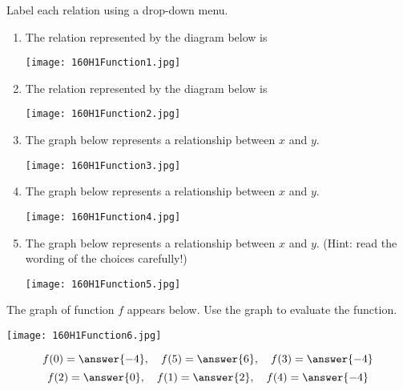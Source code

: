 \documentclass{ximera}
\begin{document}
\begin{problem}\label{prob:160hom1prob3}
Label each relation using a drop-down menu.
\begin{enumerate}
    \item The relation represented by the diagram below is 
    \begin{image}
   \texttt{[image: 160H1Function1.jpg]}
 \end{image}
 \item The relation represented by the diagram below is 
    \begin{image}
   \texttt{[image: 160H1Function2.jpg]}
 \end{image}
 \item The graph below represents a relationship between $x$ and $y$. 
    \begin{image}
   \texttt{[image: 160H1Function3.jpg]}
 \end{image}
 \item The graph below represents a relationship between $x$ and $y$. 
    \begin{image}
   \texttt{[image: 160H1Function4.jpg]}
 \end{image}
  \item The graph below represents a relationship between $x$ and $y$. 
  (Hint: read the wording of the choices carefully!)
    \begin{image}
   \texttt{[image: 160H1Function5.jpg]}
 \end{image}
\end{enumerate}
\end{problem}

\begin{problem}\label{prob:160hom1prob4}
The graph of function $f$ appears below.  Use the graph to evaluate the function.
\begin{image}
   \texttt{[image: 160H1Function6.jpg]}
 \end{image}
 $$f(0)=\answer{-4},\quad f(5)=\answer{6},\quad f(3)=\answer{-4}$$ $$f(2)=\answer{0},\quad f(1)=\answer{2},\quad f(4)=\answer{-4}$$
\end{problem}
\end{document}
